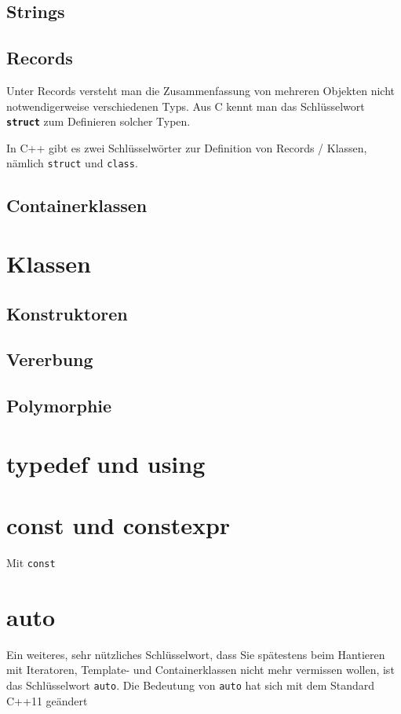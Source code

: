 \documentclass[a4paper]{report}
\begin{document}
\subsection{Strings}

\subsection{Records}
Unter Records versteht man die Zusammenfassung von mehreren Objekten nicht notwendigerweise verschiedenen Typs. Aus C kennt man das Schlüsselwort \texttt{\textbf{struct}} zum Definieren solcher Typen.

In C++ gibt es zwei Schlüsselwörter zur Definition von Records / Klassen, nämlich \texttt{struct} und \texttt{class}.




\subsection{Containerklassen}
\section{Klassen}
\subsection{Konstruktoren}
\subsection{Vererbung}
\subsection{Polymorphie}

\section{typedef und using}

\section{const und constexpr}
Mit \texttt{const} 

\section{auto}
Ein weiteres, sehr nützliches Schlüsselwort, dass Sie spätestens beim Hantieren mit Iteratoren, Template- und Containerklassen nicht mehr vermissen wollen, ist das Schlüsselwort \texttt{auto}. Die Bedeutung von \texttt{auto} hat sich mit dem Standard C++11 geändert
\end{document}
